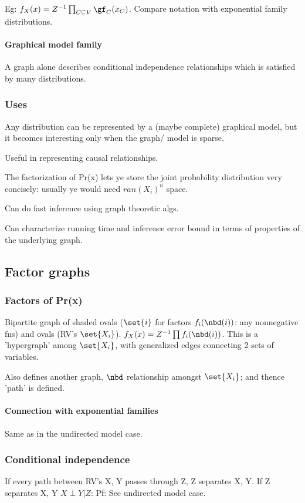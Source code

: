 \documentclass[oneside, article]{memoir}
\begin{document}
Eg: $f_X(x) = Z^{-1}\prod_{C \subseteq V} \gf_{C}(x_C)$. Compare notation with exponential family distributions.

\paragraph*{Graphical model family}
A graph alone describes conditional independence relationships which is satisfied by many distributions.

\subsubsection{Uses}
Any distribution can be represented by a (maybe complete) graphical model, but it becomes interesting only when the graph/ model is sparse.

Useful in representing causal relationships.

The factorization of Pr(x) lets ye store the joint probability distribution very concisely: usually ye would need $ran(X_i)^{n}$ space.

Can do fast inference using graph theoretic algs.

Can characterize running time and inference error bound in terms of properties of the underlying graph.

\subsection{Factor graphs}
\subsubsection{Factors of Pr(x)}
Bipartite graph of shaded ovals ($\set{i}$ for factors $f_{i}(\nbd(i))$: any nonnegative fns) and ovals (RV's $\set{X_{i}}$). $f_X(x) = Z^{-1}\prod f_{i}(\nbd(i))$. This is a 'hypergraph' among $\set{X_{i}}$, with generalized edges connecting 2 sets of variables.

Also defines another graph, $\nbd$ relationship amongst $\set{X_{i}}$; and thence 'path' is defined.

\paragraph*{Connection with exponential families}
Same as in the undirected model case.

\subsubsection{Conditional independence}
If every path between RV's X, Y passes through Z, Z separates X, Y. If Z separates X, Y $X\perp Y|Z$: Pf: See undirected model case.
\end{document}
